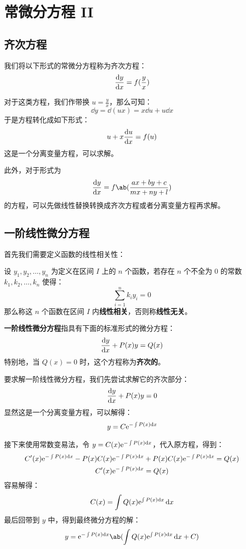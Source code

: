 \section{常微分方程 II}

\subsection{齐次方程}

\begin{definition}[齐次方程]
    我们将以下形式的常微分方程称为齐次方程：
    $$
    \dv{y}{x} = f(\frac{y}{x})
    $$
\end{definition}

对于这类方程，我们作带换 $u = \frac{y}{x}$，那么可知：
$$
\dd{y} = \dd(u x) = x \dd{u} + u \dd{x}
$$
于是方程转化成如下形式：
$$
u + x \dv{u}{x} = f(u)
$$
这是一个分离变量方程，可以求解。

此外，对于形式为
$$
\dv{y}{x} = f\ab(\frac{ax + by + c}{mx + ny + l})
$$
的方程，可以先做线性替换转换成齐次方程或者分离变量方程再求解。

\subsection{一阶线性微分方程}

首先我们需要定义函数的线性相关性：

\begin{definition}
    设 $y_1, y_2, \dots, y_n$ 为定义在区间 $I$ 上的 $n$ 个函数，若存在 $n$ 个不全为 $0$ 的常数 $k_1, k_2, \dots, k_n$ 使得：
    $$
    \sum_{i = 1}^{n} k_i y_i = 0
    $$
    那么称这 $n$ 个函数在区间 $I$ 内\textbf{线性相关}，否则称\textbf{线性无关}。
\end{definition}

\begin{definition}[一阶线性微分方程]
    \textbf{一阶线性微分方程}指具有下面的标准形式的微分方程：
    $$
    \dv{y}{x} + P(x) y = Q(x)
    $$
    特别地，当 $Q(x) = 0$ 时，这个方程称为\textbf{齐次的}。
\end{definition}

要求解一阶线性微分方程，我们先尝试求解它的齐次部分：
$$
\dv{y}{x} + P(x) y = 0
$$
显然这是一个分离变量方程，可以解得：
$$
y = C \mathrm{e}^{-\int P(x) \dd{x}}
$$

接下来使用常数变易法，令 $y = C(x) \mathrm{e}^{-\int P(x) \dd{x}}$，代入原方程，得到：
$$
\begin{gathered}
    C'(x) \mathrm{e}^{-\int P(x) \dd{x}} - P(x) C(x) \mathrm{e}^{-\int P(x) \dd{x}} + P(x) C(x) \mathrm{e}^{-\int P(x) \dd{x}} = Q(x) \\
    C'(x) \mathrm{e}^{-\int P(x) \dd{x}} = Q(x)
\end{gathered}
$$
容易解得：
$$
C(x) = \int Q(x) \mathrm{e}^{\int P(x) \dd{x}} \dd{x}
$$
最后回带到 $y$ 中，得到最终微分方程的解：
$$
y = \E^{-\int P(x) \dd{x}} \ab(\int Q(x) \E^{\int P(x) \dd{x}} \dd{x} + C)
$$


